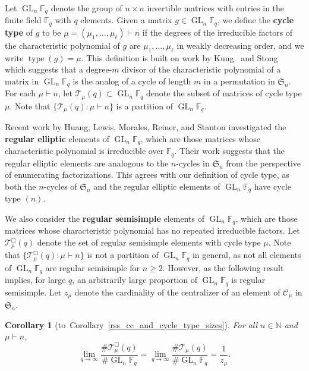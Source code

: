 \documentclass[10pt]{article}
\newtheorem{corollary}[theorem]{Corollary}
\theoremstyle{definition}
\DeclareMathOperator{\GL}{GL}
\DeclareMathOperator{\type}{type}
\newcommand{\CC}{\mathcal{C}}
\newcommand{\F}{\mathbb{F}}
\newcommand{\N}{\mathbb{N}}
\newcommand{\FS}{\mathfrak{S}}
\newcommand{\CT}{\mathcal{T}}
\newcommand{\myemph}{\textbf}
\begin{document}
Let \(\GL_n \F_q\) denote the group of \(n \times n\) invertible matrices with entries in the finite field \(\F_q\) with \(q\) elements.
Given a matrix \(g \in \GL_n \F_q\), we define the \myemph{cycle type} of \(g\) to be \(\mu = (\mu_1,\ldots,\mu_\ell) \vdash n\) if the degrees of the irreducible factors of the characteristic polynomial of \(g\) are \(\mu_1,\ldots,\mu_\ell\) in weakly decreasing order, and we write \(\type (g) = \mu\).
This definition is built on work by Kung~\cite{kung} and Stong~\cite{stong} which suggests that a degree-\(m\) divisor of the characteristic polynomial of a matrix in \(\GL_n \F_q\) is the analog of a cycle of length \(m\) in a permutation in \(\FS_n\).
For each \(\mu \vdash n\), let \(\CT_\mu (q) \subset \GL_n \F_q\) denote the subset of matrices of cycle type \(\mu\).
Note that \(\{\CT_\mu (q) : \mu \vdash n\}\) is a partition of \(\GL_n \F_q\).

Recent work by Huang, Lewis, Morales, Reiner, and Stanton \cite{HLR, LM, refl_fact} investigated the \myemph{regular elliptic} elements of \(\GL_n \F_q\), which are those matrices whose characteristic polynomial is irreducible over \(\F_q\).
Their work suggests that the regular elliptic elements are analogous to the \(n\)-cycles in \(\FS_n\) from the perspective of enumerating factorizations.
This agrees with our definition of cycle type, as both the \(n\)-cycles of \(\FS_n\) and the regular elliptic elements of \(\GL_n \F_q\) have cycle type \((n)\).







We also consider the \myemph{regular semisimple} elements of \(\GL_n \F_q\), which are those matrices whose characteristic polynomial has no repeated irreducible factors.
Let \(\CT_\mu^\Box (q)\) denote the set of regular semisimple elements with cycle type \(\mu\).
Note that \(\{\CT_\mu^\Box (q) : \mu \vdash n\}\) is not a partition of \(\GL_n \F_q\) in general, as not all elements of \(\GL_n \F_q\) are regular semisimple for \(n \geq 2\).
However, as the following result implies, for large \(q\), an arbitrarily large proportion of \(\GL_n \F_q\) is regular semisimple.
Let \(z_\mu\) denote the cardinality of the centralizer of an element of \(\CC_\mu\) in \(\FS_n\).

\begin{corollary}[to~Corollary~\ref{rss_cc_and_cycle_type_sizes}]
\label{cycle_type_ratio_limit}
For all \(n \in \N\) and \(\mu \vdash n\),
\label{dense}
\[
\lim_{q \to \infty} \frac{\# \CT_\mu^\Box (q)}{\# \GL_n \F_q} = \lim_{q \to \infty} \frac{\# \CT_\mu (q)}{\# \GL_n \F_q} = \frac{1}{z_\mu}.
\]
\end{corollary}
\end{document}
